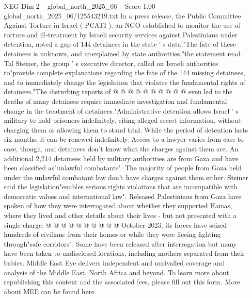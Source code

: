 \begin{textsample}{NEG Dim 2 – global\_north\_2025\_06 – Score 1.00 – global\_north\_2025\_06/125543219.txt}
In a press release, the Public Committee Against Torture in Israel ( PCATI ), an NGO established to monitor the use of torture and ill-treatment by Israeli security services against Palestinians under detention, noted a gap of 144 detainees in the state ' s data."The fate of these detainees is unknown, and unexplained by state authorities,"the statement read.
Tal Steiner, the group ' s executive director, called on Israeli authorities to"provide complete explanations regarding the fate of the 144 missing detainees, and to immediately change the legislation that violates the fundamental rights of detainees."The disturbing reports of @ @ @ @ @ @ @ @ @ @ even led to the deaths of many detainees require immediate investigation and fundamental change in the treatment of detainees."Administrative detention allows Israel ' s military to hold prisoners indefinitely, citing alleged secret information, without charging them or allowing them to stand trial.
While the period of detention lasts six months, it can be renewed indefinitely.
Access to a lawyer varies from case to case, though, and detainees don't know what the charges against them are.
An additional 2,214 detainees held by military authorities are from Gaza and have been classified as"unlawful combatants".
The majority of people from Gaza held under the unlawful combatant law don't have charges against them either.
Steiner said the legislation"enables serious rights violations that are incompatible with democratic values and international law".
Released Palestinians from Gaza have spoken of how they were interrogated about whether they supported Hamas, where they lived and other details about their lives - but not presented with a single charge. @ @ @ @ @ @ @ @ @ @ October 2023, its forces have seized hundreds of civilians from their homes or while they were fleeing fighting through"safe corridors".
Some have been released after interrogation but many have been taken to undisclosed locations, including mothers separated from their babies.
Middle East Eye delivers independent and unrivalled coverage and analysis of the Middle East, North Africa and beyond.
To learn more about republishing this content and the associated fees, please fill out this form.
More about MEE can be found here.

\end{textsample}
